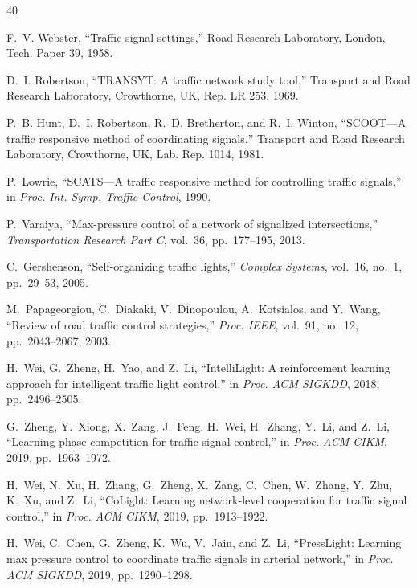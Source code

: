 \documentclass[conference]{IEEEtran}
\begin{document}

\begin{thebibliography}{40}

F.~V. Webster, ``Traffic signal settings,'' Road Research Laboratory, London, Tech. Paper 39, 1958.

D.~I. Robertson, ``TRANSYT: A traffic network study tool,'' Transport and Road Research Laboratory, Crowthorne, UK, Rep. LR 253, 1969.

P.~B. Hunt, D.~I. Robertson, R.~D. Bretherton, and R.~I. Winton, ``SCOOT---A traffic responsive method of coordinating signals,'' Transport and Road Research Laboratory, Crowthorne, UK, Lab. Rep. 1014, 1981.

P.~Lowrie, ``SCATS---A traffic responsive method for controlling traffic signals,'' in \emph{Proc. Int. Symp. Traffic Control}, 1990.

P.~Varaiya, ``Max-pressure control of a network of signalized intersections,'' \emph{Transportation Research Part C}, vol.~36, pp.~177--195, 2013.

C.~Gershenson, ``Self-organizing traffic lights,'' \emph{Complex Systems}, vol.~16, no.~1, pp.~29--53, 2005.

M.~Papageorgiou, C.~Diakaki, V.~Dinopoulou, A.~Kotsialos, and Y.~Wang, ``Review of road traffic control strategies,'' \emph{Proc. IEEE}, vol.~91, no.~12, pp.~2043--2067, 2003.

H.~Wei, G.~Zheng, H.~Yao, and Z.~Li, ``IntelliLight: A reinforcement learning approach for intelligent traffic light control,'' in \emph{Proc. ACM SIGKDD}, 2018, pp.~2496--2505.

G.~Zheng, Y.~Xiong, X.~Zang, J.~Feng, H.~Wei, H.~Zhang, Y.~Li, and Z.~Li, ``Learning phase competition for traffic signal control,'' in \emph{Proc. ACM CIKM}, 2019, pp.~1963--1972.

H.~Wei, N.~Xu, H.~Zhang, G.~Zheng, X.~Zang, C.~Chen, W.~Zhang, Y.~Zhu, K.~Xu, and Z.~Li, ``CoLight: Learning network-level cooperation for traffic signal control,'' in \emph{Proc. ACM CIKM}, 2019, pp.~1913--1922.

H.~Wei, C.~Chen, G.~Zheng, K.~Wu, V.~Jain, and Z.~Li, ``PressLight: Learning max pressure control to coordinate traffic signals in arterial network,'' in \emph{Proc. ACM SIGKDD}, 2019, pp.~1290--1298.


\end{thebibliography}
\end{document}
